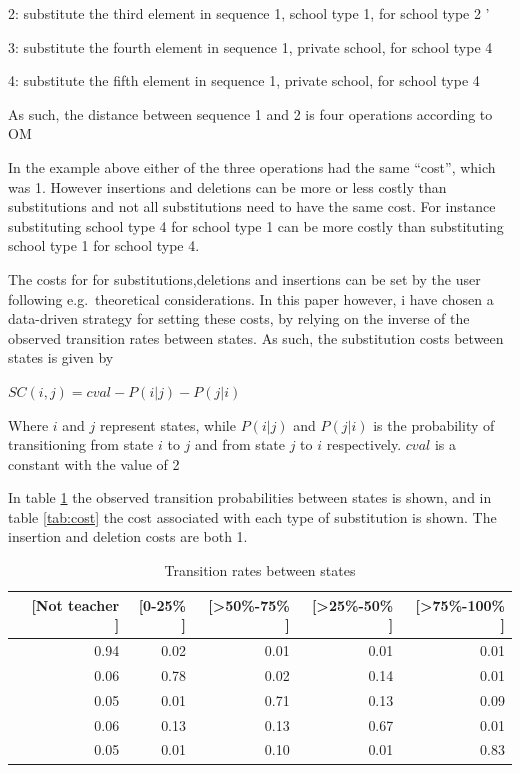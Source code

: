 \documentclass[
]{article}
\begin{document}
2: substitute the third element in sequence 1, school type 1, for school type 2 '

3: substitute the fourth element in sequence 1, private school, for school type 4

4: substitute the fifth element in sequence 1, private school, for school type 4

As such, the distance between sequence 1 and 2 is four operations according to OM

In the example above either of the three operations had the same ``cost'', which was 1. However insertions and deletions can be more or less costly than substitutions and not all substitutions need to have the same cost. For instance substituting school type 4 for school type 1 can be more costly than substituting school type 1 for school type 4.

The costs for for substitutions,deletions and insertions can be set by the user following e.g.~theoretical considerations. In this paper however, i have chosen a data-driven strategy for setting these costs, by relying on the inverse of the observed transition rates between states. As such, the substitution costs between states is given by

\(SC(i,j) = cval - P(i|j) -P(j|i)\)

Where \(i\) and \(j\) represent states, while \(P(i|j)\) and \(P(j|i)\) is the probability of transitioning from state \(i\) to \(j\) and from state \(j\) to \(i\) respectively. \(cval\) is a constant with the value of 2

In table \ref{tab:trate} the observed transition probabilities between states is shown, and in table \ref{tab:cost} the cost associated with each type of substitution is shown. The insertion and deletion costs are both 1.

\begin{table}

\caption{\label{tab:trate}Transition rates between states}
\centering
\begin{tabular}[t]{l|r|r|r|r|r}
\hline
  & [Not teacher ] & [0-25\% ] & [>50\%-75\% ] & [>25\%-50\% ] & [>75\%-100\% ]\\
\hline
[Not teacher ->] & 0.94 & 0.02 & 0.01 & 0.01 & 0.01\\
\hline
[0-25\% ->] & 0.06 & 0.78 & 0.02 & 0.14 & 0.01\\
\hline
[>50\%-75\% ->] & 0.05 & 0.01 & 0.71 & 0.13 & 0.09\\
\hline
[>25\%-50\% ->] & 0.06 & 0.13 & 0.13 & 0.67 & 0.01\\
\hline
[>75\%-100\% ->] & 0.05 & 0.01 & 0.10 & 0.01 & 0.83\\
\hline
\end{tabular}
\end{table}
\end{document}
